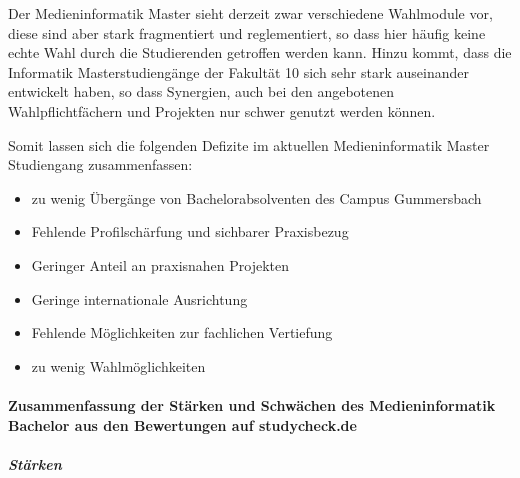 Der Medieninformatik Master sieht derzeit zwar verschiedene Wahlmodule
vor, diese sind aber stark fragmentiert und reglementiert, so dass hier
häufig keine echte Wahl durch die Studierenden getroffen werden kann.
Hinzu kommt, dass die Informatik Masterstudiengänge der Fakultät 10 sich
sehr stark auseinander entwickelt haben, so dass Synergien, auch bei den
angebotenen Wahlpflichtfächern und Projekten nur schwer genutzt werden
können.

Somit lassen sich die folgenden Defizite im aktuellen Medieninformatik
Master Studiengang zusammenfassen:

\begin{itemize}
\tightlist
\item
  zu wenig Übergänge von Bachelorabsolventen des Campus Gummersbach
\item
  Fehlende Profilschärfung und sichbarer Praxisbezug
\item
  Geringer Anteil an praxisnahen Projekten
\item
  Geringe internationale Ausrichtung
\item
  Fehlende Möglichkeiten zur fachlichen Vertiefung
\item
  zu wenig Wahlmöglichkeiten
\end{itemize}

\paragraph{Zusammenfassung der Stärken und Schwächen des
Medieninformatik Bachelor aus den Bewertungen auf
studycheck.de}\label{zusammenfassung-der-stuxe4rken-und-schwuxe4chen-des-medieninformatik-bachelor-aus-den-bewertungen-auf-studycheck.de}

\subparagraph{Stärken}\label{stuxe4rken}

